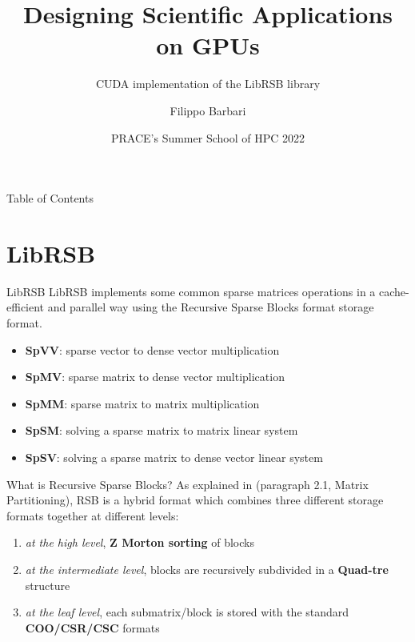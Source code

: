 \documentclass{beamer}
\title[Project 2221]{Designing Scientific Applications on GPUs}
\subtitle{CUDA implementation of the LibRSB library}
\author[Filippo Barbari]{Filippo Barbari}
\institute[LUX]{University of Luxembourg}
\date[Summer School 2022]{PRACE's Summer School of HPC 2022}
\begin{document}
	
	\frame{\titlepage}
	
	\begin{frame}{Table of Contents}
		\tableofcontents
	\end{frame}
	
	\section{LibRSB}
	\begin{frame}{LibRSB}
		LibRSB implements some common sparse matrices operations in a cache-efficient and parallel way using the Recursive Sparse Blocks format storage format.
		\begin{itemize}
			\item \textbf{SpVV}: sparse vector to dense vector multiplication
			\item \textbf{SpMV}: sparse matrix to dense vector multiplication
			\item \textbf{SpMM}: sparse matrix to matrix multiplication
			\item \textbf{SpSM}: solving a sparse matrix to matrix linear system
			\item \textbf{SpSV}: solving a sparse matrix to dense vector linear system
		\end{itemize}
	\end{frame}
	
	\begin{frame}{What is Recursive Sparse Blocks?}
		As explained in \cite{martone2010utilizing} (paragraph 2.1, Matrix Partitioning), RSB is a hybrid format which combines three different storage formats together at different levels:
		\begin{enumerate}
			\item \textit{at the high level}, \textbf{Z Morton sorting} of blocks
			\item \textit{at the intermediate level}, blocks are recursively subdivided in a \textbf{Quad-tre} structure
			\item \textit{at the leaf level}, each submatrix/block is stored with the standard \textbf{COO/CSR/CSC} formats
		\end{enumerate}
	\end{frame}
	
\end{document}
